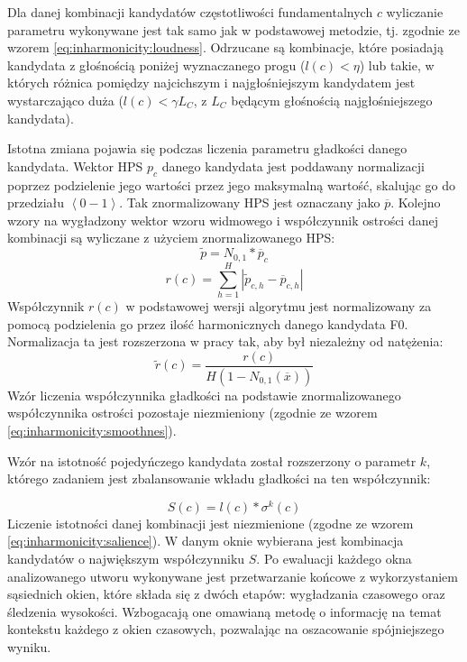 \documentclass[12pt,a4paper,twoside]{mwart}
\begin{document}
Dla danej kombinacji kandydatów częstotliwości fundamentalnych $c$ wyliczanie parametru wykonywane jest tak samo jak w podstawowej metodzie, tj. zgodnie ze wzorem \ref{eq:inharmonicity:loudness}. Odrzucane są kombinacje, które posiadają kandydata z głośnością poniżej wyznaczanego progu ($l(c) < \eta$) lub takie, w których różnica pomiędzy najcichszym i najgłośniejszym kandydatem jest wystarczająco duża ($l(c) < \gamma L_C$, z $L_C$ będącym głośnością najgłośniejszego kandydata).

Istotna zmiana pojawia się podczas liczenia parametru gładkości danego kandydata. Wektor HPS $p_c$ danego kandydata jest poddawany normalizacji poprzez podzielenie jego wartości przez jego maksymalną wartość, skalując go do przedziału $\left<0-1\right>$. Tak znormalizowany HPS jest oznaczany jako $\overline{p}$. Kolejno wzory na wygładzony wektor wzoru widmowego i współczynnik ostrości danej kombinacji są wyliczane z użyciem znormalizowanego HPS:
\begin{equation}\label{eq:inharmonicity2:hpsSmoothed}
  \widetilde{p} = N_{0,1}\ast \overline{p}_c 
\end{equation}
\begin{equation}\label{eq:inharmonicity2:sharpness}
  r(c) = \sum_{h=1}^H\left|\widetilde{p}_{c,h} - \overline{p}_{c,h} \right|
\end{equation}
Współczynnik $r(c)$ w podstawowej wersji algorytmu jest normalizowany za pomocą podzielenia go przez ilość harmonicznych danego kandydata F0. Normalizacja ta jest rozszerzona w pracy
\cite[5-6]{Transcription:Pertus:Inharmonicity2} 
tak, aby był niezależny od natężenia:
\begin{equation}\label{eq:inharmonicity2:roughness}
  \widetilde{r}(c) = \frac{r(c)}{H(1 - N_{0, 1}(\overline{x}))}
\end{equation}
Wzór liczenia współczynnika gładkości na podstawie znormalizowanego współczynnika ostrości pozostaje niezmieniony (zgodnie ze wzorem \ref{eq:inharmonicity:smoothnes}).

Wzór na istotność pojedyńczego kandydata został rozszerzony o parametr $k$, którego zadaniem jest zbalansowanie wkładu gładkości na ten współczynnik:

\begin{equation}\label{eq:inharmonicity2:salience}
S(c) = l(c) * \sigma^k(c)
\end{equation}
Liczenie istotności danej kombinacji jest niezmienione (zgodne ze wzorem \ref{eq:inharmonicity:salience}). W danym oknie wybierana jest kombinacja kandydatów o największym współczynniku $S$. Po ewaluacji każdego okna analizowanego utworu wykonywane jest przetwarzanie końcowe z wykorzystaniem sąsiednich okien, które składa się z dwóch etapów: wygładzania czasowego oraz śledzenia wysokości. Wzbogacają one omawianą metodę o informację na temat kontekstu każdego z okien czasowych, pozwalając na oszacowanie spójniejszego wyniku.
\end{document}

